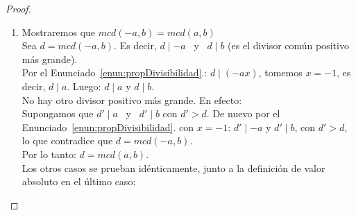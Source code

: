 \begin{proof}
\begin{enumerate}[label=\roman*)]
Luego, por el Enunciado~\ref{enun:propDivisibilidad}.: 
$\forall x,y \in \Z \; \, d \mid (ax + cy)$. \\
En particular, $d \mid (ax_0 + cy_0)$. \\
Es decir: $d \mid b$, pues $b = ax_0 + cy_0$ \\
\setcounter{enumi}{2}
Por el Enunciado~\ref{enun:propDivisibilidad}.: $d \leq b$. \\
Por definición de máximo común divisor, d es positivo. \\
Por la forma de seleccionarlo, b es positivo. \\
Resumiendo: $b \mid a$ y $b \mid c$, $d \leq b$, $d$ es el máximo común divisor. \\
No nos queda sino concluir que $b = d$. \\
Es decir, $d = mcd(a,c) = ax_0 + cy_0$. Lo que prueba el enunciado. 
\setcounter{enumi}{1}
\item Mostraremos que $mcd(-a,b) = mcd(a,b)$ \\
Sea $d  =  mcd(-a,b)$. Es decir, $d \mid -a$ \, y \, $d \mid b$ (es el divisor común positivo más grande). \\
\setcounter{enumi}{3}
Por el Enunciado~\ref{enun:propDivisibilidad}.: $d \mid (-ax)$, tomemos $x = -1$, es decir, $d \mid a$.
Luego: $d \mid a$ y $d \mid b$. \\
No hay otro divisor positivo más grande. En efecto: \\
Supongamos que $d' \mid a$ \, y \, $d' \mid b$ con $d' > d$. De nuevo por el Enunciado~\ref{enun:propDivisibilidad}. con $x = -1$:
$d' \mid -a$ y $d' \mid b$, con $d' > d$, lo que contradice que $d  =  mcd(-a,b)$. \\
Por lo tanto: $d  =  mcd(a,b)$. \\
Los otros casos se prueban idénticamente, junto a la definición de valor absoluto en el último caso: 


\end{enumerate}
\end{proof}
